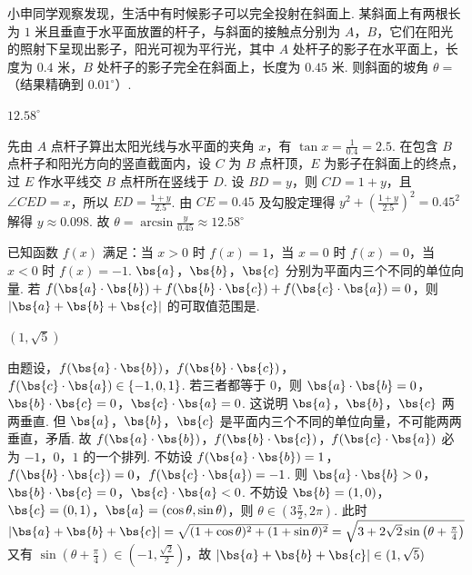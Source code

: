 \documentclass[UTF8,a4paper,oneside,11pt]{ctexbook}
\begin{document}
\begin{problem}
小申同学观察发现，生活中有时候影子可以完全投射在斜面上. 某斜面上有两根长为 \(1\) 米且垂直于水平面放置的杆子，与斜面的接触点分别为 \(A\)，\(B\)，它们在阳光的照射下呈现出影子，阳光可视为平行光，其中 \(A\) 处杆子的影子在水平面上，长度为 \(0.4\) 米，\(B\) 处杆子的影子完全在斜面上，长度为 \(0.45\) 米. 则斜面的坡角 \(\theta=\)\fillinblank{}（结果精确到 \(0.01^\circ\)）.

\end{problem}

\begin{answer}
\(12.58^\circ\)
\end{answer}

\begin{solution}
先由 \(A\) 点杆子算出太阳光线与水平面的夹角 \(x\)，有 \(\tan x=\frac{1}{0.4}=2.5\).
在包含 \(B\) 点杆子和阳光方向的竖直截面内，设 \(C\) 为 \(B\) 点杆顶，\(E\) 为影子在斜面上的终点，过 \(E\) 作水平线交 \(B\) 点杆所在竖线于 \(D\). 设 \(BD=y\)，则 \(CD=1+y\)，且 \(\angle CED=x\)，所以 \(ED=\frac{1+y}{2.5}\).
由 \(CE=0.45\) 及勾股定理得
\(
y^2+\left(\frac{1+y}{2.5}\right)^2=0.45^2
\)
解得 \(y\approx0.098\).
故
\(
\theta=\arcsin\frac{y}{0.45}\approx12.58^\circ
\)
\end{solution}

\begin{problem}
已知函数 \(f(x)\) 满足：当 \(x>0\) 时 \(f(x)=1\)，当 \(x=0\) 时 \(f(x)=0\)，当 \(x<0\) 时 \(f(x)=-1\). \(\bs{a}\)，\(\bs{b}\)，\(\bs{c}\) 分别为平面内三个不同的单位向量. 若 \(f(\bs{a}\cdot\bs{b})+f(\bs{b}\cdot\bs{c})+f(\bs{c}\cdot\bs{a})=0\)，则 \(|\bs{a}+\bs{b}+\bs{c}|\) 的可取值范围是\fillinblank{}.
\end{problem}

\begin{answer}
\((1,\sqrt5)\)
\end{answer}

\begin{solution}
由题设，\(f(\bs{a}\cdot\bs{b})\)，\(f(\bs{b}\cdot\bs{c})\)，\(f(\bs{c}\cdot\bs{a})\in\{-1,0,1\}\). 若三者都等于 \(0\)，则
\(\bs{a}\cdot\bs{b}=0\)，\(\bs{b}\cdot\bs{c}=0\)，\(\bs{c}\cdot\bs{a}=0\).
这说明 \(\bs{a}\)，\(\bs{b}\)，\(\bs{c}\) 两两垂直. 但 \(\bs{a}\)，\(\bs{b}\)，\(\bs{c}\) 是平面内三个不同的单位向量，不可能两两垂直，矛盾.
故 \(f(\bs{a}\cdot\bs{b})\)，\(f(\bs{b}\cdot\bs{c})\)，\(f(\bs{c}\cdot\bs{a})\) 必为 \(-1\)，\(0\)，\(1\) 的一个排列. 不妨设
\(f(\bs{a}\cdot\bs{b})=1\)，\(f(\bs{b}\cdot\bs{c})=0\)，\(f(\bs{c}\cdot\bs{a})=-1\).
则
\(\bs{a}\cdot\bs{b}>0\)，\(\bs{b}\cdot\bs{c}=0\)，\(\bs{c}\cdot\bs{a}<0\).
不妨设 \(\bs{b}=(1,0)\)，\(\bs{c}=(0,1)\)，\(\bs{a}=(\cos\theta,\sin\theta)\)，则 \(\theta\in(3\frac{\pi}{2},2\pi)\). 此时
\(
|\bs{a}+\bs{b}+\bs{c}|=\sqrt{(1+\cos\theta)^2+(1+\sin\theta)^2}=\sqrt{3+2\sqrt2\sin\left(\theta+\frac{\pi}{4}\right)}
\)
又有 \(\sin\left(\theta+\frac{\pi}{4}\right)\in\left(-1,\frac{\sqrt2}{2}\right)\)，故
\(
|\bs{a}+\bs{b}+\bs{c}|\in(1,\sqrt5)
\)
\end{solution}
\end{document}
